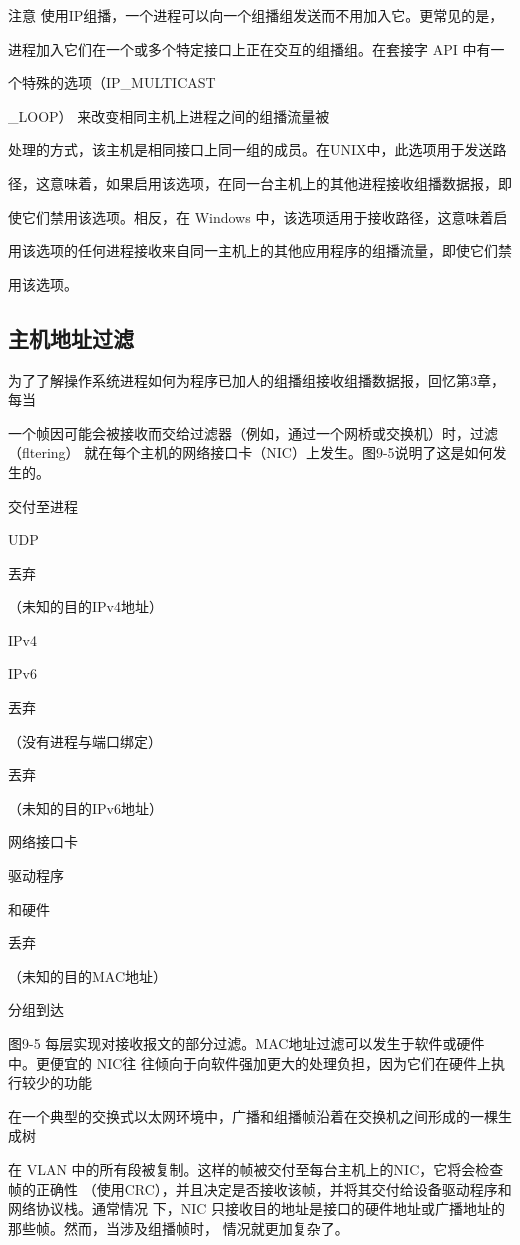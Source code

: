注意 使用IP组播，一个进程可以向一个组播组发送而不用加入它。更常见的是，

进程加入它们在一个或多个特定接口上正在交互的组播组。在套接字 API 中有一

个特殊的选项（IP\_MULTICAST

\_LOOP） 来改变相同主机上进程之间的组播流量被

处理的方式，该主机是相同接口上同一组的成员。在UNIX中，此选项用于发送路

径，这意味着，如果启用该选项，在同一台主机上的其他进程接收组播数据报，即

使它们禁用该选项。相反，在 Windows 中，该选项适用于接收路径，这意味着启

用该选项的任何进程接收来自同一主机上的其他应用程序的组播流量，即使它们禁

用该选项。

\subsection{主机地址过滤}
为了了解操作系统进程如何为程序已加人的组播组接收组播数据报，回忆第3章，每当

一个帧因可能会被接收而交给过滤器（例如，通过一个网桥或交换机）时，过滤（fltering）
就在每个主机的网络接口卡（NIC）上发生。图9-5说明了这是如何发生的。

交付至进程

UDP

丟弃

（未知的目的IPv4地址）

IPv4

IPv6

丟弃

（没有进程与端口绑定）

丟弃

（未知的目的IPv6地址）

网络接口卡

驱动程序

和硬件

丢弃

（未知的目的MAC地址）

分组到达

图9-5 每层实现对接收报文的部分过滤。MAC地址过滤可以发生于软件或硬件中。更便宜的 NIC往
往倾向于向软件强加更大的处理负担，因为它们在硬件上执行较少的功能

在一个典型的交换式以太网环境中，广播和组播帧沿着在交换机之间形成的一棵生成树

在 VLAN 中的所有段被复制。这样的帧被交付至每台主机上的NIC，它将会检查帧的正确性
（使用CRC），并且决定是否接收该帧，并将其交付给设备驱动程序和网络协议栈。通常情况
下，NIC 只接收目的地址是接口的硬件地址或广播地址的那些帧。然而，当涉及组播帧时，
情况就更加复杂了。

